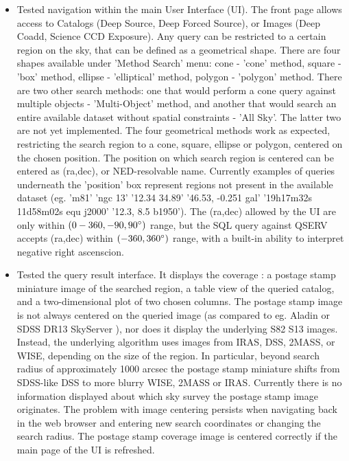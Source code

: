 \documentclass[fleqn,usenatbib, onecolumn]{mnras} %
\begin{document}
\begin{itemize}
	\item Tested navigation within the main User Interface (UI). The front page allows access to Catalogs (Deep Source, Deep Forced Source), or Images (Deep Coadd, Science CCD Exposure). Any query can be restricted to a certain region on the sky, that can be defined as a geometrical shape. There are four shapes available under  'Method Search' menu:  cone - 'cone' method,  square - 'box' method,  ellipse - 'elliptical' method, polygon - 'polygon' method.  There are two other search methods: one that would perform a cone query against multiple objects - 'Multi-Object' method, and  another  that would search an entire available dataset without spatial constraints  - 'All Sky'. The latter two are not yet implemented. The four geometrical methods work as expected, restricting the search region to a cone, square, ellipse or polygon, centered on the chosen position.  The position on which search region is centered can be entered as (ra,dec), or NED-resolvable name. Currently examples of queries underneath the 'position' box represent regions not present in the available dataset (eg. 'm81' 'ngc 13' '12.34 34.89' '46.53, -0.251 gal'  '19h17m32s 11d58m02s equ j2000' '12.3, 8.5 b1950'). The (ra,dec) allowed by the UI are only within  $(0-360, -90,90 \degree)$ range, but the SQL query against QSERV  accepts (ra,dec) within $(-360,360 \degree)$ range, with a built-in ability to interpret negative right ascenscion.

	\item Tested the query result interface. It displays the coverage : a postage stamp miniature image of the searched region, a table view of the queried catalog, and a two-dimensional plot of two chosen columns. The postage  stamp image is not always centered on the queried image (as compared to eg. Aladin or SDSS DR13 SkyServer ), nor does it display the underlying S82 S13 images. Instead, the underlying algorithm uses images  from IRAS, DSS, 2MASS, or WISE, depending on the size of the region. In particular, beyond search radius of  approximately 1000 arcsec the postage stamp miniature shifts from SDSS-like DSS to more blurry WISE, 2MASS or IRAS.  Currently there is no information displayed about which sky survey the postage stamp image originates. The problem with image centering persists when navigating back in the web browser and entering new search coordinates or changing the search radius. The postage stamp coverage image is centered correctly if the main page of the UI is refreshed. 


\end{itemize}
\end{document}
